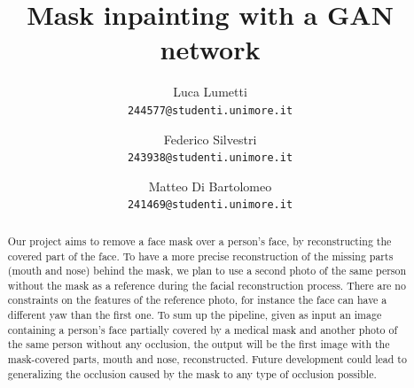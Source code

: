 \documentclass[10pt,twocolumn,letterpaper]{article}
\begin{document}
\title{Mask inpainting with a GAN network}

\author{Luca Lumetti\\
{\tt\small 244577@studenti.unimore.it}
\and
Federico Silvestri\\
{\tt\small 243938@studenti.unimore.it}
\and
Matteo Di Bartolomeo\\
{\tt\small 241469@studenti.unimore.it}
}

\maketitle

\begin{abstract}
  Our project aims to remove a face mask over a person’s face, by reconstructing
  the covered part of the face. To have a more precise reconstruction of the
  missing parts (mouth and nose) behind the mask, we plan to use a second photo
  of the same person without the mask as a reference during the facial
  reconstruction process. There are no constraints on the features of the
  reference photo, for instance the face can have a different yaw than the first one.
  To sum up the pipeline, given as input an image containing a
  person’s face partially covered by a medical mask and another photo of the
  same person without any occlusion, the output will be the first image with
  the mask-covered parts, mouth and nose, reconstructed. Future development
  could lead to generalizing the occlusion caused by the mask to any type of
  occlusion possible.
\end{abstract}

\end{document}
